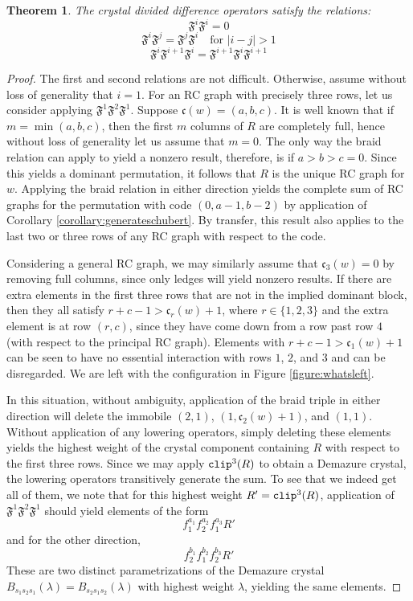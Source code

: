 \documentclass{amsart}
\newtheorem{theorem}{Theorem}[section]
\theoremstyle{definition}
\theoremstyle{remark}
\numberwithin{equation}{subsection}
\newcommand{\rcdd}{\mathfrak{F}}
\newcommand{\code}{\mathfrak{c}}
\begin{document}
\begin{theorem}
The crystal divided difference operators satisfy the relations:
$$\rcdd^i\rcdd^i = 0$$
$$\rcdd^i\rcdd^j = \rcdd^j\rcdd^i\quad\mbox{for }|i-j|>1$$
$$\rcdd^i\rcdd^{i+1}\rcdd^i = \rcdd^{i+1}\rcdd^i\rcdd^{i+1}$$
\end{theorem}

\begin{proof}
The first and second relations are not difficult. Otherwise, assume without loss of generality that $i=1$. For an RC graph with precisely three rows, let us consider applying $\rcdd^1\rcdd^2\rcdd^1$. Suppose $\code(w) = (a, b, c)$. It is well known that if $m=\min(a, b, c)$, then the first $m$ columns of $R$ are completely full, hence without loss of generality let us assume that $m=0$. The only way the braid relation can apply to yield a nonzero result, therefore, is if $a>b>c=0$. Since this yields a dominant permutation, it follows that $R$ is the unique RC graph for $w$. Applying the braid relation in either direction yields the complete sum of RC graphs for the permutation with code $(0, a - 1, b - 2)$ by application of Corollary \ref{corollary:generateschubert}. By transfer, this result also applies to the last two or three rows of any RC graph with respect to the code.

Considering a general RC graph, we may similarly assume that $\code_3(w)=0$ by removing full columns, since only ledges will yield nonzero results. If there are extra elements in the first three rows that are not in the implied dominant block, then they all satisfy $r + c - 1 > \code_r(w) + 1$, where $r\in \{1,2,3\}$ and the extra element is at row $(r,c)$, since they have come down from a row past row $4$ (with respect to the principal RC graph). Elements with $r + c - 1 > \code_1(w) + 1$ can be seen to have no essential interaction with rows $1$, $2$, and $3$ and can be disregarded. We are left with the configuration in Figure \ref{figure:whatsleft}.

In this situation, without ambiguity, application of the braid triple in either direction will delete the immobile $(2,1)$, $(1, \code_2(w) + 1)$, and $(1,1)$. Without application of any lowering operators, simply deleting these elements yields the highest weight of the crystal component containing $R$ with respect to the first three rows. Since we may apply $\mathtt{clip}^3(R)$ to obtain a Demazure crystal, the lowering operators transitively generate the sum. To see that we indeed get all of them, we note that for this highest weight $R' = \mathtt{clip}^3(R)$, application of $\rcdd^1\rcdd^2\rcdd^1$ should yield elements of the form
$$f_1^{a_1}f_2^{a_2}f_1^{a_3}R'$$
and for the other direction,
$$f_2^{b_1}f_1^{b_2}f_2^{b_3}R'$$
These are two distinct parametrizations of the Demazure crystal $B_{s_1s_2s_1}(\lambda)=B_{s_2s_1s_2}(\lambda)$ with highest weight $\lambda$, yielding the same elements.
\end{proof}
\end{document}
